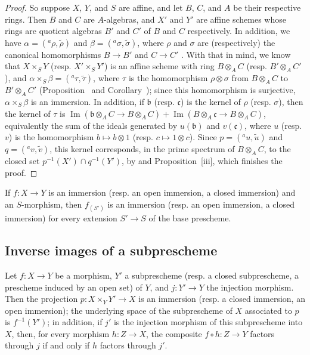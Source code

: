 \begin{proof}
So suppose $X$, $Y$, and $S$ are affine, and let $B$, $C$, and $A$ be their respective rings.
Then $B$ and $C$ are $A$-algebras, and $X'$ and $Y'$ are affine schemes whose rings are quotient algebras $B'$ and $C'$ of $B$ and $C$ respectively.
In addition, we have $\alpha=({}^a\rho,\widetilde{\rho})$ and $\beta=({}^a\sigma,\widetilde{\sigma})$, where $\rho$ and $\sigma$ are (respectively) the canonical homomorphisms $B\to B'$ and $C\to C'$ .
With that in mind, we know that $X\times_S Y$ (resp. $X'\times_S Y'$) is an affine scheme with ring $B\otimes_A C$ (resp. $B'\otimes_A C'$), and $\alpha\times_S\beta=({}^a\tau,\widetilde{\tau})$, where $\tau$ is the homomorphism $\rho\otimes\sigma$ from $B\otimes_A C$ to $B'\otimes_A C'$ (Proposition~ and Corollary~);
since this homomorphism is surjective, $\alpha\times_S\beta$ is an immersion.
In addition, if $\mathfrak{b}$ (resp. $\mathfrak{c}$) is the kernel of $\rho$ (resp. $\sigma$), then the kernel of $\tau$ is
$\operatorname{Im}(\mathfrak{b}\otimes_A C\to B\otimes_A C)+\operatorname{Im}(B\otimes_A\mathfrak{c}\to B\otimes_A C)$,
equivalently the sum of the ideals generated by $u(\mathfrak{b})$ and $v(\mathfrak{c})$, where $u$ (resp. $v$) is the homomorphism $b\mapsto b\otimes 1$ (resp. $c\mapsto 1\otimes c$).
Since $p=({}^a u,\widetilde{u})$ and $q=({}^a v,\widetilde{v})$, this kernel corresponds, in the prime spectrum of $B\otimes_A C$, to the closed set $p^{-1}(X')\cap q^{-1}(Y')$, by  and Proposition~[iii], which finishes the proof.
\end{proof}

\begin{corollary}[4.3.2]
\label{I.4.3.2}
If $f:X\to Y$ is an immersion (resp. an open immersion, a closed immersion) and an $S$-morphism, then $f_{(S')}$ is an immersion (resp. an open immersion, a closed immersion) for every extension $S'\to S$ of the base prescheme.
\end{corollary}

\subsection{Inverse images of a subprescheme}
\label{subsection:I.4.4}

\begin{proposition}[4.4.1]
\label{I.4.4.1}
Let $f:X\to Y$ be a morphism, $Y'$ a subprescheme (resp. a closed subprescheme, a prescheme induced by an open set) of $Y$, and $j:Y'\to Y$ the injection morphism.
Then the projection $p:X\times_Y Y'\to X$ is an immersion (resp. a closed immersion, an open immersion);
the underlying space of the subprescheme of $X$ associated to $p$ is $f^{-1}(Y')$;
in addition, if $j'$ is the injection morphism of this subprescheme into $X$, then, for every morphism $h:Z\to X$, the composite $f\circ h:Z\to Y$ factors through $j$ if and only if $h$ factors through $j'$.
\end{proposition}

